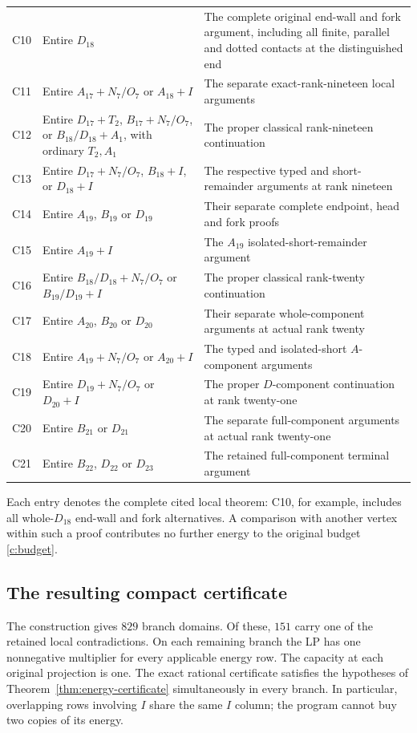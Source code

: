 \begin{longtable}{>{\raggedright\arraybackslash}p{.08\linewidth}
 >{\raggedright\arraybackslash}p{.43\linewidth}
 >{\raggedright\arraybackslash}p{.39\linewidth}}
C10&Entire $D_{18}$&The complete original end-wall and fork argument,
 including all finite, parallel and dotted contacts at the distinguished end\\
C11&Entire $A_{17}+N_7/O_7$ or $A_{18}+I$&
 The separate exact-rank-nineteen local arguments\\
C12&Entire $D_{17}+T_2$, $B_{17}+N_7/O_7$, or
 $B_{18}/D_{18}+A_1$, with ordinary $T_2,A_1$&
 The proper classical rank-nineteen continuation\\
C13&Entire $D_{17}+N_7/O_7$, $B_{18}+I$, or $D_{18}+I$&
 The respective typed and short-remainder arguments at rank nineteen\\
C14&Entire $A_{19}$, $B_{19}$ or $D_{19}$&
 Their separate complete endpoint, head and fork proofs\\
C15&Entire $A_{19}+I$&The $A_{19}$ isolated-short-remainder argument\\
C16&Entire $B_{18}/D_{18}+N_7/O_7$ or $B_{19}/D_{19}+I$&
 The proper classical rank-twenty continuation\\
C17&Entire $A_{20}$, $B_{20}$ or $D_{20}$&
 Their separate whole-component arguments at actual rank twenty\\
C18&Entire $A_{19}+N_7/O_7$ or $A_{20}+I$&
 The typed and isolated-short $A$-component arguments\\
C19&Entire $D_{19}+N_7/O_7$ or $D_{20}+I$&
 The proper $D$-component continuation at rank twenty-one\\
C20&Entire $B_{21}$ or $D_{21}$&
 The separate full-component arguments at actual rank twenty-one\\
C21&Entire $B_{22}$, $D_{22}$ or $D_{23}$&
 The retained full-component terminal argument\\\bottomrule
\end{longtable}

Each entry denotes the complete cited local theorem: C10, for example,
includes all whole-$D_{18}$ end-wall and fork alternatives. A comparison
with another vertex within such a proof contributes no further energy
to the original budget \eqref{c:budget}.

\subsection{The resulting compact certificate}
\label{c:certificate}

The construction gives $829$ branch domains. Of these, $151$ carry one
of the retained local contradictions. On each remaining branch the LP
has one nonnegative multiplier for every applicable energy row. The
capacity at each original projection is one. The exact rational
certificate satisfies the hypotheses of
Theorem~\ref{thm:energy-certificate} simultaneously in every branch.
In particular, overlapping rows involving $I$ share the same $I$ column;
the program cannot buy two copies of its energy.

